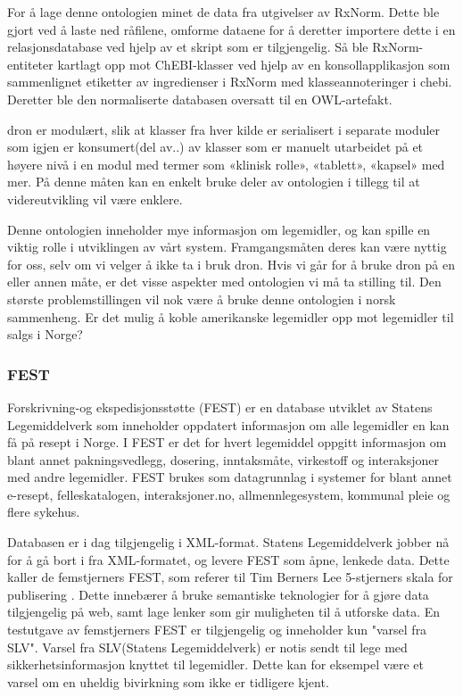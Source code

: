 For å lage denne ontologien minet de data fra utgivelser av RxNorm. Dette ble gjort ved å laste ned råfilene, omforme dataene for å deretter importere dette i en relasjonsdatabase ved hjelp av et skript som er tilgjengelig. Så ble RxNorm-entiteter kartlagt opp mot ChEBI-klasser ved hjelp av en konsollapplikasjon som sammenlignet etiketter av ingredienser i RxNorm med klasseannoteringer i \gls{chebi}. Deretter ble den normaliserte databasen oversatt til en OWL-artefakt. 

\gls{dron} er modulært, slik at klasser fra hver kilde er serialisert i separate moduler som igjen er konsumert(del av..) av klasser som er manuelt utarbeidet på et høyere nivå i en modul med termer som «klinisk rolle», «tablett», «kapsel» med mer. På denne måten kan en enkelt bruke deler av ontologien i tillegg til at videreutvikling vil være enklere. 

Denne ontologien inneholder mye informasjon om legemidler, og kan spille en viktig rolle i utviklingen av vårt system. Framgangsmåten deres kan være nyttig for oss, selv om vi velger å ikke ta i bruk \gls{dron}. Hvis vi går for å bruke \gls{dron} på en eller annen måte, er det visse aspekter med ontologien vi må ta stilling til. Den største problemstillingen vil nok være å bruke denne ontologien i norsk sammenheng. Er det mulig å koble amerikanske legemidler opp mot legemidler til salgs i Norge? 
\subsubsection{FEST} \label{FEST}
Forskrivning-og ekspedisjonsstøtte (FEST) er en database utviklet av Statens Legemiddelverk som inneholder oppdatert informasjon om alle legemidler en kan få på resept i Norge. I FEST er det for hvert legemiddel oppgitt informasjon om blant annet pakningsvedlegg, dosering, inntaksmåte, virkestoff og interaksjoner med andre legemidler. FEST brukes som datagrunnlag i systemer for blant annet e-resept, felleskatalogen, interaksjoner.no, allmennlegesystem, kommunal pleie og flere sykehus.

Databasen er i dag tilgjengelig i XML-format. Statens Legemiddelverk jobber nå for å gå bort i fra XML-formatet, og levere FEST som åpne, lenkede data. Dette kaller de femstjerners FEST, som referer til Tim Berners Lee 5-stjerners skala for publisering \citep{Femstjerner_FEST}. Dette innebærer å bruke semantiske teknologier for å gjøre data tilgjengelig på web, samt lage lenker som gir muligheten til å utforske data. En testutgave av femstjerners FEST er tilgjengelig og inneholder kun "varsel fra SLV". Varsel fra SLV(Statens Legemiddelverk) er notis sendt til lege med sikkerhetsinformasjon knyttet til legemidler. Dette kan for eksempel være et varsel om en uheldig bivirkning som ikke er tidligere kjent. 
